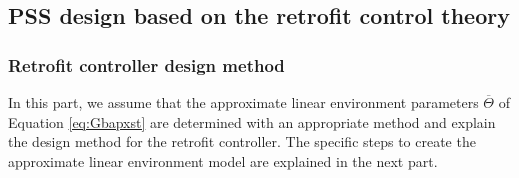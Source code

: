 \documentclass[graybox, envcountchap]{svmult}
\begin{document}
\subsection{PSS design based on the retrofit control theory\advanced}\label{sec:designret}

\smallskip
\subsubsection{Retrofit controller design method}

In this part, we assume that the approximate linear environment parameters $\overline{\mathit{\Theta}}$ of Equation \ref{eq:Gbapxst} are determined with an appropriate method and explain the design method for the retrofit controller.
The specific steps to create the approximate linear environment model are explained in the next part.
\end{document}
